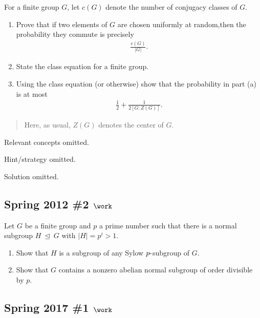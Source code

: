 For a finite group \(G\), let \(c(G)\) denote the number of conjugacy
classes of \(G\).

\begin{enumerate}
\def\labelenumi{\alph{enumi}.}
\item
  Prove that if two elements of \(G\) are chosen uniformly at
  random,then the probability they commute is precisely
  \begin{align*}
  \frac{c(G)}{{\left\lvert {G} \right\rvert}}
  .\end{align*}
\item
  State the class equation for a finite group.
\item
  Using the class equation (or otherwise) show that the probability in
  part (a) is at most
  \begin{align*}
  \frac 1 2 + \frac 1 {2[G : Z(G)]}
  .\end{align*}
\end{enumerate}

\begin{quote}
Here, as usual, \(Z(G)\) denotes the center of \(G\).
\end{quote}

Relevant concepts omitted.

Hint/strategy omitted.

Solution omitted.

\hypertarget{spring-2012-2-work}{%
\subsection{\texorpdfstring{Spring 2012 \#2
\(\work\)}{Spring 2012 \#2 \textbackslash work}}\label{spring-2012-2-work}}

Let \(G\) be a finite group and \(p\) a prime number such that there is
a normal subgroup \(H{~\trianglelefteq~}G\) with
\({\left\lvert {H} \right\rvert} = p^i > 1\).

\begin{enumerate}
\def\labelenumi{\alph{enumi}.}
\item
  Show that \(H\) is a subgroup of any Sylow \(p{\hbox{-}}\)subgroup of
  \(G\).
\item
  Show that \(G\) contains a nonzero abelian normal subgroup of order
  divisible by \(p\).
\end{enumerate}

\hypertarget{spring-2017-1-work}{%
\subsection{\texorpdfstring{Spring 2017 \#1
\(\work\)}{Spring 2017 \#1 \textbackslash work}}\label{spring-2017-1-work}}

